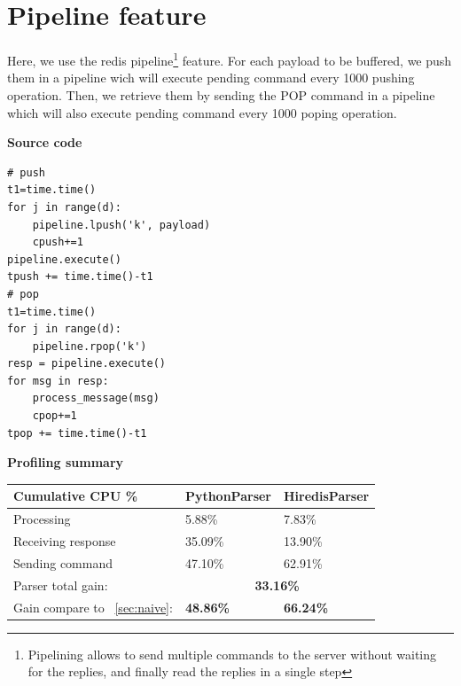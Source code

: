 \documentclass[a4paper, 11pt]{report}
\begin{document}
\newpage
\section{Pipeline feature\label{sec:pipeline}}
Here, we use the redis pipeline\footnote{Pipelining allows to send multiple commands to the server without waiting for the replies, and finally read the replies in a single step} feature.
For each payload to be buffered, we push them in a pipeline wich will execute pending command every 1000 pushing operation. Then, we retrieve them by sending the POP command in a pipeline which will also execute pending command every 1000 poping operation.\\

\begin{minipage}[t]{0.45\textwidth}
\textbf{Source code}\\
\vspace{-0.5em}
\begin{lstlisting}
# push
t1=time.time()
for j in range(d):
    pipeline.lpush('k', payload)
    cpush+=1
pipeline.execute()
tpush += time.time()-t1
# pop
t1=time.time()
for j in range(d):
    pipeline.rpop('k')
resp = pipeline.execute()
for msg in resp:
    process_message(msg)
    cpop+=1
tpop += time.time()-t1
\end{lstlisting}
\end{minipage}
\quad
\begin{minipage}[t]{0.5\textwidth}
\textbf{Profiling summary}\\

    \begin{tabular}{|l|l|l|}
        \hline
        Cumulative CPU \% & PythonParser & HiredisParser\\
        \hline
        Processing & 5.88\% & 7.83\%\\
        \hline
        Receiving response & 35.09\% & 13.90\%\\
        \hline
        Sending command & 47.10\% & 62.91\%\\
        \hline
        Parser total gain: & \multicolumn{2}{c|}{\textbf{33.16\%}}\\
        \hline
        Gain compare to ~\ref{sec:naive}: & \textbf{48.86\%} & \textbf{66.24\%}\\
        \hline
    \end{tabular}
\end{minipage}
\end{document}

